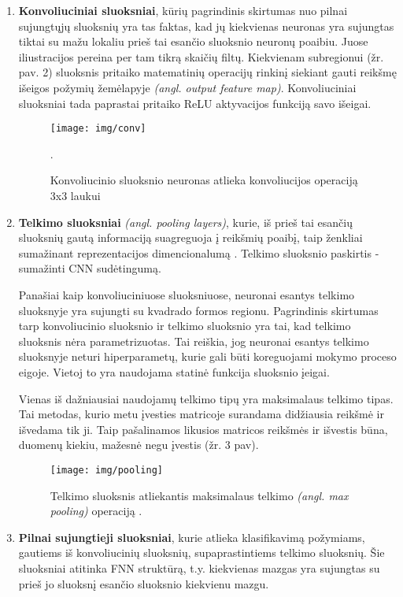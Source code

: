 \documentclass{VUMIFPSkursinis}
\begin{document}
\begin{enumerate}
  \item \textbf{Konvoliuciniai sluoksniai}, kūrių pagrindinis skirtumas nuo pilnai sujungtųjų sluoksnių yra tas faktas, kad jų kiekvienas neuronas yra sujungtas tiktai su mažu lokaliu prieš tai esančio sluoksnio neuronų poaibiu. Juose iliustracijos pereina per tam tikrą skaičių filtų. Kiekvienam subregionui (žr. pav. 2) sluoksnis pritaiko matematinių operacijų rinkinį siekiant gauti reikšmę išeigos požymių žemėlapyje \textit{(angl. output feature map)}. Konvoliuciniai sluoksniai tada paprastai pritaiko ReLU aktyvacijos funkciją savo išeigai. 
  
  \begin{figure}[H]
    \centering
    \texttt{[image: img/conv]}
    \caption{ Konvoliucinio sluoksnio neuronas atlieka konvoliucijos operaciją 3x3 laukui \cite{Nont}}.
    \label{img:conv}
  \end{figure}
  
  \item \textbf{Telkimo sluoksniai} \textit{(angl. pooling layers)}, kurie, iš prieš tai esančių sluoksnių gautą informaciją suagreguoja į reikšmių poaibį, taip ženkliai sumažinant reprezentacijos dimencionalumą \cite{Pooling}. Telkimo sluoksnio paskirtis - sumažinti CNN sudėtingumą. 

  Panašiai kaip konvoliuciniuose sluoksniuose, neuronai esantys telkimo sluoksnyje yra sujungti su kvadrado formos regionu. Pagrindinis skirtumas tarp konvoliucinio sluoksnio ir telkimo sluoksnio yra tai, kad telkimo sluoksnis nėra parametrizuotas. Tai reiškia, jog neuronai esantys telkimo sluoksnyje neturi hiperparametų, kurie gali būti koreguojami mokymo proceso eigoje. Vietoj to yra naudojama statinė funkcija sluoksnio įeigai.

  Vienas iš dažniausiai naudojamų telkimo tipų yra maksimalaus telkimo tipas. Tai metodas, kurio metu įvesties matricoje surandama didžiausia reikšmė ir išvedama tik ji. Taip pašalinamos likusios matricos reikšmės ir išvestis būna, duomenų kiekiu, mažesnė negu įvestis (žr. 3 pav).

  \begin{figure}[H]
    \centering
    \texttt{[image: img/pooling]}
    \caption{Telkimo sluoksnis atliekantis maksimalaus telkimo \textit{(angl. max pooling)} operaciją \cite{Nont}.}
    \label{img:pooling}
  \end{figure}


  \item \textbf{Pilnai sujungtieji sluoksniai}, kurie atlieka klasifikavimą požymiams, gautiems iš konvoliucinių sluoksnių, supaprastintiems telkimo sluoksnių. Šie sluoksniai atitinka FNN struktūrą, t.y. kiekvienas mazgas yra sujungtas su prieš jo sluoksnį esančio sluoksnio kiekvienu mazgu. \cite{TFMnist}
\end{enumerate}
\end{document}
